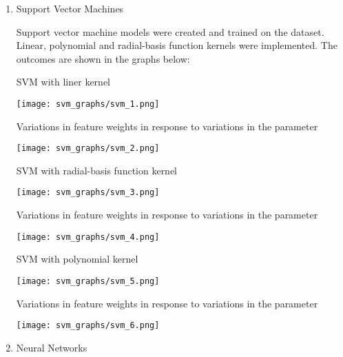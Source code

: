 \documentclass[12pt]{article}
\begin{document}
\begin{enumerate}
		\item Support Vector Machines
		
		Support vector machine models were created and trained on the dataset. Linear, polynomial and radial-basis function kernels were implemented. The outcomes are shown in the graphs below:\\
		
		\pagebreak
		
		SVM with liner kernel\\
		
		\begin{center}
			\texttt{[image: svm\_graphs/svm\_1.png]}
		\end{center}
		
		Variations in feature weights in response to variations in the parameter\\
		
		\begin{center}
			\texttt{[image: svm\_graphs/svm\_2.png]}
		\end{center}
		
		SVM with radial-basis function kernel\\
		
		\begin{center}
			\texttt{[image: svm\_graphs/svm\_3.png]}
		\end{center}
		
		Variations in feature weights in response to variations in the parameter\\
		
		\begin{center}
			\texttt{[image: svm\_graphs/svm\_4.png]}
		\end{center}
		
		SVM with polynomial kernel\\
		
		\begin{center}
			\texttt{[image: svm\_graphs/svm\_5.png]}
		\end{center}
		
		Variations in feature weights in response to variations in the parameter\\
		
		\begin{center}
			\texttt{[image: svm\_graphs/svm\_6.png]}
		\end{center}
	
		\item Neural Networks
		

\end{enumerate}
\end{document}
